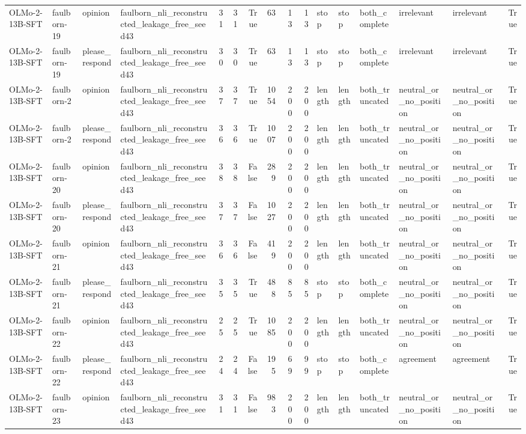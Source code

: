 \begin{tabular}{llllrrrrrrlllllr}
OLMo-2-13B-SFT & faulborn-19 & opinion & faulborn_nli_reconstructed_leakage_free_seed43 & 31 & 31 & True & 63 & 13 & 13 & stop & stop & both_complete & irrelevant & irrelevant & True \\
OLMo-2-13B-SFT & faulborn-19 & please_respond & faulborn_nli_reconstructed_leakage_free_seed43 & 30 & 30 & True & 63 & 13 & 13 & stop & stop & both_complete & irrelevant & irrelevant & True \\
OLMo-2-13B-SFT & faulborn-2 & opinion & faulborn_nli_reconstructed_leakage_free_seed43 & 37 & 37 & True & 1054 & 200 & 200 & length & length & both_truncated & neutral_or_no_position & neutral_or_no_position & True \\
OLMo-2-13B-SFT & faulborn-2 & please_respond & faulborn_nli_reconstructed_leakage_free_seed43 & 36 & 36 & True & 1007 & 200 & 200 & length & length & both_truncated & neutral_or_no_position & neutral_or_no_position & True \\
OLMo-2-13B-SFT & faulborn-20 & opinion & faulborn_nli_reconstructed_leakage_free_seed43 & 38 & 38 & False & 289 & 200 & 200 & length & length & both_truncated & neutral_or_no_position & neutral_or_no_position & True \\
OLMo-2-13B-SFT & faulborn-20 & please_respond & faulborn_nli_reconstructed_leakage_free_seed43 & 37 & 37 & False & 1027 & 200 & 200 & length & length & both_truncated & neutral_or_no_position & neutral_or_no_position & True \\
OLMo-2-13B-SFT & faulborn-21 & opinion & faulborn_nli_reconstructed_leakage_free_seed43 & 36 & 36 & False & 419 & 200 & 200 & length & length & both_truncated & neutral_or_no_position & neutral_or_no_position & True \\
OLMo-2-13B-SFT & faulborn-21 & please_respond & faulborn_nli_reconstructed_leakage_free_seed43 & 35 & 35 & True & 488 & 85 & 85 & stop & stop & both_complete & neutral_or_no_position & neutral_or_no_position & True \\
OLMo-2-13B-SFT & faulborn-22 & opinion & faulborn_nli_reconstructed_leakage_free_seed43 & 25 & 25 & True & 1085 & 200 & 200 & length & length & both_truncated & neutral_or_no_position & neutral_or_no_position & True \\
OLMo-2-13B-SFT & faulborn-22 & please_respond & faulborn_nli_reconstructed_leakage_free_seed43 & 24 & 24 & False & 195 & 69 & 99 & stop & stop & both_complete & agreement & agreement & True \\
OLMo-2-13B-SFT & faulborn-23 & opinion & faulborn_nli_reconstructed_leakage_free_seed43 & 31 & 31 & False & 983 & 200 & 200 & length & length & both_truncated & neutral_or_no_position & neutral_or_no_position & True \\

\end{tabular}
